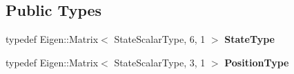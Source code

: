 \subsection*{Public Types}
\begin{DoxyCompactItemize}
\item 
typedef Eigen\+::\+Matrix$<$ State\+Scalar\+Type, 6, 1 $>$ {\bfseries State\+Type}\hypertarget{classtudat_1_1observation__models_1_1OneWayRangeObservationModel_acbbf08e274c07f3669f92a59fa75248e}{}\label{classtudat_1_1observation__models_1_1OneWayRangeObservationModel_acbbf08e274c07f3669f92a59fa75248e}

\item 
typedef Eigen\+::\+Matrix$<$ State\+Scalar\+Type, 3, 1 $>$ {\bfseries Position\+Type}\hypertarget{classtudat_1_1observation__models_1_1OneWayRangeObservationModel_a4c1e8b7673cf6811660d3639bbe8b560}{}\label{classtudat_1_1observation__models_1_1OneWayRangeObservationModel_a4c1e8b7673cf6811660d3639bbe8b560}

\end{DoxyCompactItemize}
